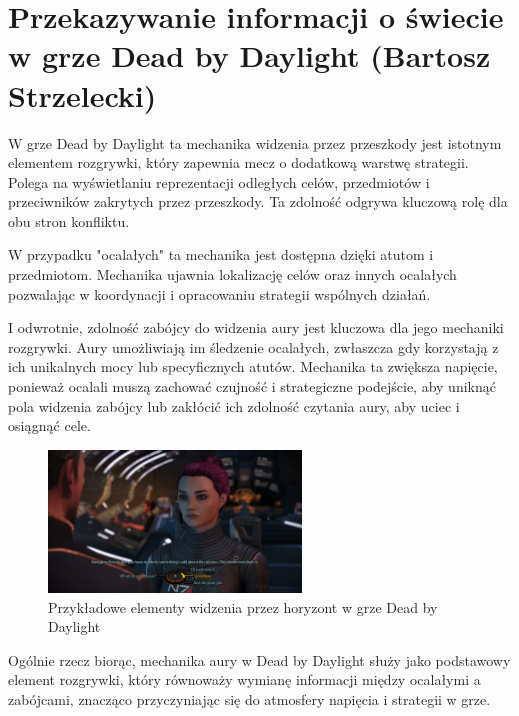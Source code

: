 \section{Przekazywanie informacji o świecie w grze Dead by Daylight (Bartosz Strzelecki)}

W grze Dead by Daylight ta mechanika widzenia przez przeszkody jest istotnym elementem rozgrywki, który
zapewnia mecz o dodatkową warstwę strategii. Polega na wyświetlaniu reprezentacji odległych celów, przedmiotów i przeciwników
zakrytych przez przeszkody. Ta zdolność odgrywa kluczową rolę dla obu stron konfliktu.

W przypadku "ocalałych" ta mechanika jest dostępna dzięki atutom i przedmiotom. Mechanika ujawnia lokalizację celów oraz
innych ocalałych pozwalając w koordynacji i opracowaniu strategii wspólnych działań.

I odwrotnie, zdolność zabójcy do widzenia aury jest kluczowa dla jego mechaniki rozgrywki.
Aury umożliwiają im śledzenie ocalałych, zwłaszcza gdy korzystają z ich unikalnych mocy lub specyficznych atutów. 
Mechanika ta zwiększa napięcie, ponieważ ocalali muszą zachować czujność i strategiczne podejście, 
aby uniknąć pola widzenia zabójcy lub zakłócić ich zdolność czytania aury, aby uciec i osiągnąć cele.

\begin{figure}[h]
\centering
\includegraphics[width=0.6\textwidth]{images/me}
\caption{Przykładowe elementy widzenia przez horyzont w grze Dead by Daylight}
\end{figure}

Ogólnie rzecz biorąc, mechanika aury w Dead by Daylight służy jako podstawowy element rozgrywki,
który równoważy wymianę informacji między ocalałymi a zabójcami, znacząco przyczyniając się do atmosfery napięcia i strategii w grze.

